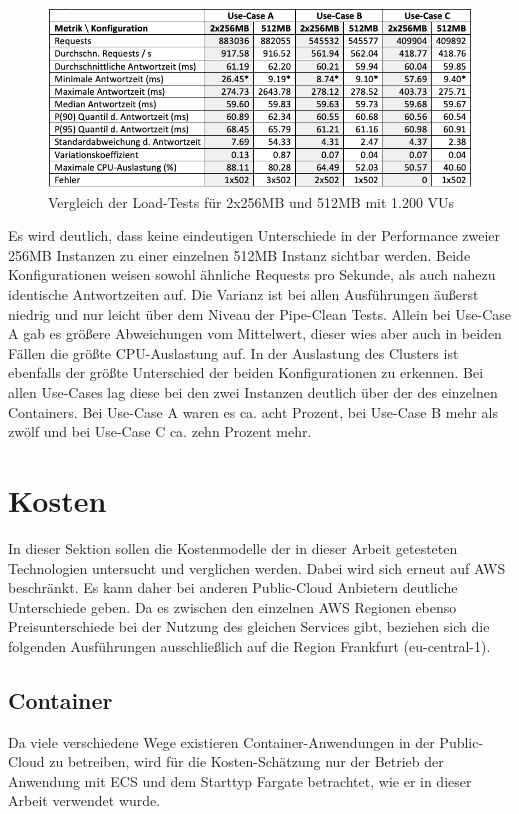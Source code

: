 \begin{figure}[H]
    \includegraphics[width=\textwidth]{img/fargate-2x256-vs-512-load1200-comparison.png}
    \caption[Vergleich der Load-Tests für 2x256MB und 512MB mit 1.200 VUs]{Vergleich der Load-Tests für 2x256MB und 512MB mit 1.200 VUs}
    \label{fig:fargate-2x256-vs-512-load1200-comparison}
\end{figure}

Es wird deutlich, dass keine eindeutigen Unterschiede in der Performance zweier 256MB Instanzen zu einer einzelnen 512MB Instanz sichtbar werden. Beide Konfigurationen weisen sowohl ähnliche Requests pro Sekunde, als auch nahezu identische Antwortzeiten auf. Die Varianz ist bei allen Ausführungen äußerst niedrig und nur leicht über dem Niveau der Pipe-Clean Tests. Allein bei Use-Case A gab es größere Abweichungen vom Mittelwert, dieser wies aber auch in beiden Fällen die größte CPU-Auslastung auf. In der Auslastung des Clusters ist ebenfalls der größte Unterschied der beiden Konfigurationen zu erkennen. Bei allen Use-Cases lag diese bei den zwei Instanzen deutlich über der des einzelnen Containers. Bei Use-Case A waren es ca. acht Prozent, bei Use-Case B mehr als zwölf und bei Use-Case C ca. zehn Prozent mehr. 


\section{Kosten}
\label{sec:kosten}
In dieser Sektion sollen die Kostenmodelle der in dieser Arbeit getesteten Technologien untersucht und verglichen werden. Dabei wird sich erneut auf \ac{AWS} beschränkt. Es kann daher bei anderen Public-Cloud Anbietern deutliche Unterschiede geben. Da es zwischen den einzelnen \ac{AWS} Regionen ebenso Preisunterschiede bei der Nutzung des gleichen Services gibt, beziehen sich die folgenden Ausführungen ausschließlich auf die Region Frankfurt (eu-central-1).

\subsection{Container}
Da viele verschiedene Wege existieren Container-Anwendungen in der Public-Cloud zu betreiben, wird für die Kosten-Schätzung nur der Betrieb der Anwendung mit \ac{ECS} und dem Starttyp Fargate betrachtet, wie er in dieser Arbeit verwendet wurde.

